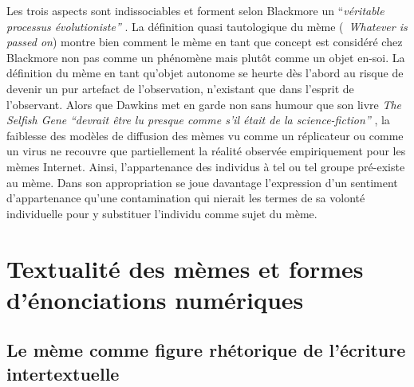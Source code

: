 Les trois aspects sont indissociables et forment selon Blackmore un {\textquotedblleft}\textit{v\'eritable processus \'evolutioniste{\textquotedblright} }\citep{Blackmore2006}. La d\'efinition quasi tautologique du m\`eme ({\guillemotleft}~\textit{Whatever is passed on{\guillemotright}}) montre bien comment le m\`eme en tant que concept est consid\'er\'e chez Blackmore non pas comme un ph\'enom\`ene mais plut\^ot comme un objet en-soi. La d\'efinition du m\`eme en tant qu{\textquoteright}objet autonome se heurte d\`es l{\textquoteright}abord au risque de devenir un pur artefact de l{\textquoteright}observation, n{\textquoteright}existant que dans l{\textquoteright}esprit de l{\textquoteright}observant. Alors que Dawkins met en garde non sans humour que son livre \textit{The Selfish Gene} \textit{{\textquotedblleft}devrait \^etre lu presque comme s{\textquoteright}il \'etait de la science-fiction{\textquotedblright} }\citep{Dawkins1989}, la faiblesse des mod\`eles de diffusion des m\`emes vu comme un r\'eplicateur ou comme un virus ne recouvre que partiellement la r\'ealit\'e observ\'ee empiriquement pour les m\`emes Internet. Ainsi, l{\textquoteright}appartenance des individus \`a tel ou tel groupe pr\'e-existe au m\`eme. Dans son appropriation se joue davantage l{\textquoteright}expression d{\textquoteright}un sentiment d{\textquoteright}appartenance qu{\textquoteright}une contamination qui nierait les termes de sa volont\'e individuelle pour y substituer l{\textquoteright}individu comme sujet du m\`eme.  


\section[Textualit\'e des m\`emes et formes d{\textquoteright}\'enonciations num\'eriques]{Textualit\'e des m\`emes et formes d{\textquoteright}\'enonciations num\'eriques}

\subsection[Le m\`eme comme figure rh\'etorique de l{\textquoteright}\'ecriture intertextuelle]{Le m\`eme comme figure rh\'etorique de l{\textquoteright}\'ecriture intertextuelle}

